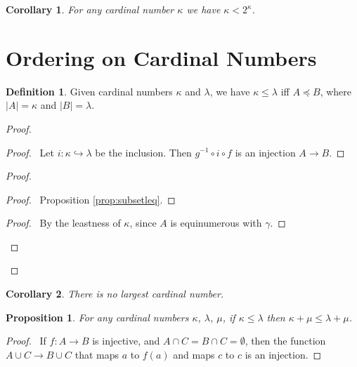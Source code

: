 \documentclass{book}
\let\qed\relax
\newtheorem{prop}[ax]{Proposition}
\newtheorem{cor}{Corollary}[ax]
\theoremstyle{definition}
\newtheorem{df}[ax]{Definition}
\begin{document}
\begin{cor}
For any cardinal number $\kappa$ we have $\kappa < 2^\kappa$.
\end{cor}

\section{Ordering on Cardinal Numbers}

\begin{df}
Given cardinal numbers $\kappa$ and $\lambda$, we have $\kappa \leq \lambda$ iff $A \preccurlyeq B$, where $|A| = \kappa$ and $|B| = \lambda$.
\end{df}

\begin{proof}
\pf
{}
\begin{proof}
	\pf\ Let $i : \kappa \hookrightarrow \lambda$ be the inclusion. Then $g^{-1} \circ i \circ f$ is an injection $A \rightarrow B$.
\end{proof}
\begin{proof}
	\begin{proof}
		\pf\ Proposition \ref{prop:subsetleq}.
	\end{proof}
	\begin{proof}
		\pf\ By the leastness of $\kappa$, since $A$ is equinumerous with $\gamma$.
	\end{proof}
\end{proof}
\qed
\end{proof}

\begin{cor}
There is no largest cardinal number.
\end{cor}

\begin{prop}
For any cardinal numbers $\kappa$, $\lambda$, $\mu$, if $\kappa \leq \lambda$ then $\kappa + \mu \leq \lambda + \mu$.
\end{prop}

\begin{proof}
\pf\ If $f : A \rightarrow B$ is injective, and $A \cap C = B \cap C = \emptyset$, then the function $A \cup C \rightarrow B \cup C$ that maps $a$ to $f(a)$ and maps $c$ to $c$ is an injection. \qed
\end{proof}
\end{document}
